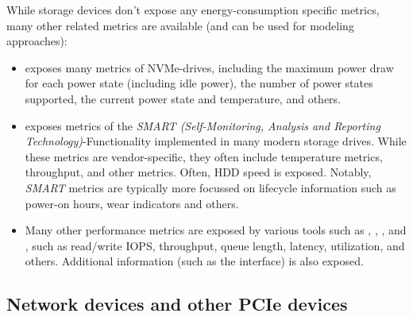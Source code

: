 While storage devices don't expose any energy-consumption specific metrics, many other related metrics are available (and can be used for modeling approaches):
\begin{itemize}
    \item {}\parencite{nvmecli_github} exposes many metrics of NVMe-drives, including the maximum power draw for each power state (including idle power), the number of power states supported, the current power state and temperature, and others.
    \item {}\parencite{smartmontools_github} exposes metrics of the \textit{SMART (Self-Monitoring, Analysis and Reporting Technology)}-Functionality implemented in many modern storage drives. While these metrics are vendor-specific, they often include temperature metrics, throughput, and other metrics. Often, HDD speed is exposed. Notably, \textit{SMART} metrics are typically more focussed on lifecycle information such as power-on hours, wear indicators and others.
    \item Many other performance metrics are exposed by various tools such as , , , and , such as read/write IOPS, throughput, queue length, latency, utilization, and others. Additional information (such as the interface) is also exposed.
\end{itemize}

\subsection{Network devices and other PCIe devices}

